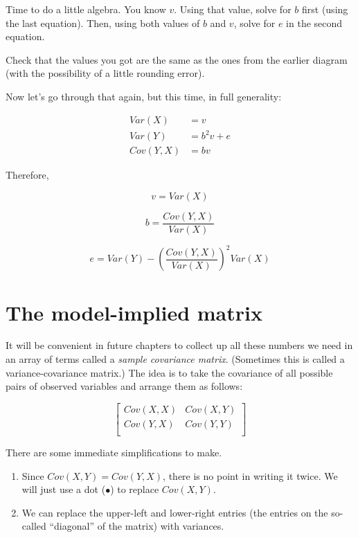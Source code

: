\documentclass[
]{book}
\providecommand{\tightlist}{%
  \setlength{\itemsep}{0pt}\setlength{\parskip}{0pt}}
\begin{document}
Time to do a little algebra. You know \(v\). Using that value, solve for \(b\) first (using the last equation). Then, using both values of \(b\) and \(v\), solve for \(e\) in the second equation.

Check that the values you got are the same as the ones from the earlier diagram (with the possibility of a little rounding error).

Now let's go through that again, but this time, in full generality:

\begin{align}
Var(X) &= v \\
Var(Y) &= b^2v + e \\
Cov(Y, X) &= bv
\end{align}

Therefore,

\[
v = Var(X)
\]

\[
b = \frac{Cov(Y, X)}{Var(X)}
\]

\[
e = Var(Y) - \left( \frac{Cov(Y, X)}{Var(X)} \right)^2 Var(X)
\]

\hypertarget{simple-mim}{%
\section{The model-implied matrix}\label{simple-mim}}

It will be convenient in future chapters to collect up all these numbers we need in an array of terms called a \emph{sample covariance matrix}. (Sometimes this is called a variance-covariance matrix.) The idea is to take the covariance of all possible pairs of observed variables and arrange them as follows:

\[
\begin{bmatrix}
Cov(X, X)    &    Cov(X, Y) \\
Cov(Y, X)    &    Cov(Y, Y) \\
\end{bmatrix}
\]

There are some immediate simplifications to make.

\begin{enumerate}
\def\labelenumi{\arabic{enumi}.}
\tightlist
\item
  Since \(Cov(X, Y) = Cov(Y, X)\), there is no point in writing it twice. We will just use a dot (\(\bullet\)) to replace \(Cov(X, Y)\).
\item
  We can replace the upper-left and lower-right entries (the entries on the so-called ``diagonal'' of the matrix) with variances.
\end{enumerate}
\end{document}

